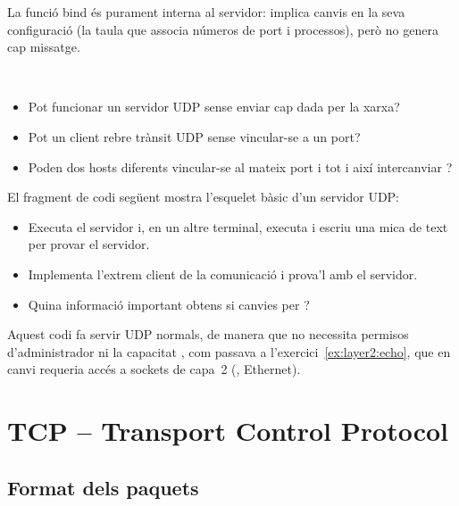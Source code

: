 La funció bind és purament interna al servidor: implica canvis en la seva configuració
(la taula que associa números de port i processos), però no genera cap missatge.

\begin{exercise}\ \\[-0.5cm]
\begin{itemize}
\item Pot funcionar un servidor UDP sense enviar cap dada per la xarxa?
\item Pot un client rebre trànsit UDP sense vincular-se a un port?
\item Poden dos hosts diferents vincular-se al mateix port i tot i així intercanviar ?
\end{itemize}
\end{exercise}


\begin{exercise}
El fragment de codi següent mostra l'esquelet bàsic d'un servidor UDP:

\begin{center}
\end{center}

\begin{itemize}
\item Executa el servidor i, en un altre terminal, executa  i escriu una mica de text per provar
  el servidor.
\item Implementa l'extrem client de la comunicació i prova'l amb el servidor.
\item Quina informació important obtens si canvies  per ?
\end{itemize}

\begin{remark}
Aquest codi fa servir  UDP normals, de manera que no necessita permisos d'administrador
ni la capacitat , com passava a l'exercici~\ref{ex:layer2:echo},
que en canvi requeria accés a sockets de capa~2 (\eg, Ethernet).
\end{remark}
\end{exercise}

\section{TCP -- Transport Control Protocol}\label{sec:layer4:tcp}
\subsection{Format dels paquets}\label{sec:layer4:tcp:packet_format}

